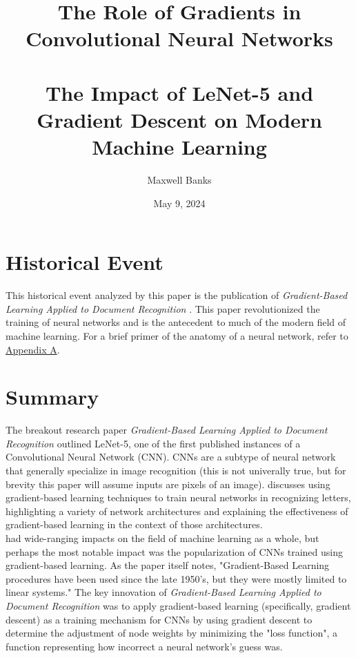 \documentclass[11pt, a4paper]{article}
\title{
    The Role of Gradients in Convolutional Neural Networks\\~\\
    \large The Impact of LeNet-5 and Gradient Descent on Modern Machine Learning}
\author{
    Maxwell Banks
}
\date{May 9, 2024}
\begin{document}
\nocite{*}
\maketitle
\newpage

\section{Historical Event}
This historical event analyzed by this paper is the publication of \textit{Gradient-Based Learning Applied to 
Document Recognition} \cite{lecun}. This paper revolutionized the training of neural networks and is the antecedent 
to much of the modern field of machine learning. For a brief primer of the anatomy of a neural network, refer to 
\hyperref[sec:neuralnet]{Appendix A}.

\section{Summary}
The breakout research paper \textit{Gradient-Based Learning Applied to Document Recognition} \cite{lecun}
outlined LeNet-5, one of the first published instances of a Convolutional Neural Network (CNN). CNNs are a subtype
of neural network that generally specialize in image recognition (this is not univerally true, but for brevity this
paper will assume inputs are pixels of an image). \cite{lecun} discusses using gradient-based learning 
techniques to train neural networks in recognizing letters, highlighting a variety of network architectures 
and explaining the effectiveness of gradient-based learning in the context of those architectures. \\

\cite{lecun} had wide-ranging impacts on the field of machine learning as a whole, but perhaps the most 
notable impact was the popularization of CNNs trained using gradient-based learning. As the paper itself notes, 
"Gradient-Based Learning procedures have been used since the late 1950's, but they were mostly limited to 
linear systems." \cite{lecun} The key innovation of \textit{Gradient-Based Learning Applied to Document Recognition} was to apply gradient-based 
learning (specifically, gradient descent) as a training mechanism for CNNs by using gradient descent to determine
the adjustment of node weights by minimizing the "loss function", a function representing how incorrect a neural 
network's guess was.\\
\end{document}
